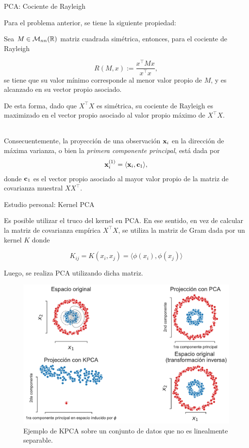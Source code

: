 \documentclass[9pt, handout]{beamer}
\begin{document}
\begin{frame}{PCA: Cociente de Rayleigh}
	
Para el problema anterior, se tiene la siguiente propiedad:

\begin{lemma}

Sea $M\in\mathcal{M}_{nn}(\mathbb{R})$ matriz cuadrada simétrica, entonces, para el cociente de Rayleigh

\begin{equation*}
	R(M,x):=\frac{x^\top Mx}{x^\top x},
\end{equation*}
se tiene que su valor mínimo corresponde al menor valor propio de $M$, y es alcanzado en su vector propio asociado.

\end{lemma}
\pause
De esta forma, dado que $X^\top X$ es simétrica, su cociente de Rayleigh es maximizado en el vector propio asociado al valor propio máximo de $X^\top X$.\\~\ \pause

Consecuentemente, la proyección de una observación $\mathbf{x}_i$ en la dirección de máxima varianza, o bien la \emph{primera componente principal}, está dada por 
\begin{equation*}
	\mathbf{x}_i^{(1)} = \langle \mathbf{x}_i, \mathbf{c}_1 \rangle,
\end{equation*}
donde $\mathbf{c}_1$ es el vector propio asociado al mayor valor propio de la matriz de covarianza muestral $XX^\top$.\\	
\end{frame}

\begin{frame}{Estudio personal: Kernel PCA}

Es posible utilizar el truco del kernel en PCA. En ese sentido, en vez de calcular la matriz de covarianza empírica $X^\top X$, se utiliza la matriz de Gram dada por un kernel $K$ donde

$$
K_{ij} = K(x_i,x_j) = \langle\phi(x_i),\phi(x_j)\rangle
$$

Luego, se realiza PCA utilizando dicha matriz.\\ \pause

\begin{figure}[ht]
    \centering
    \includegraphics[width=0.6\linewidth]{../img/cap6_kpca.pdf}
    \caption{Ejemplo de KPCA sobre un conjunto de datos que no es linealmente separable.}
    \label{fig:kpca}
\end{figure}

\end{frame}
\end{document}
